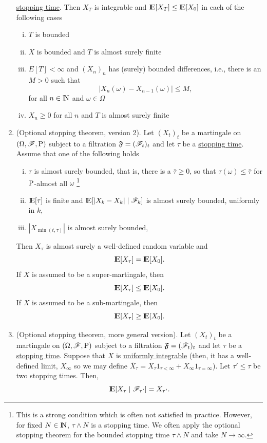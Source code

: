 \documentclass[a4paper,10pt]{scrbook}
\begin{document}
\begin{enumerate}
       \hyperlink{link:stopping_time}{stopping time}. 
       Then \(X_T\) is integrable and \(\E[X_T] \leq \E[X_0]\) in each of the following cases
	  \begin{enumerate}[i.]
	   \item \(T\) is bounded 
	   \item \(X\) is bounded and \(T\) is almost surely finite
	   \item \(E[T]<\infty\) and \((X_n)_n\) has (surely) bounded differences, i.e., there is an \(M>0\) such that
	    \[
	     |X_n(\omega) - X_{n-1}(\omega)| \leq M, 
	    \]
	   for all \(n\in\N\) and \(\omega\in\Omega\)
	   \item \(X_n\geq 0\) for all \(n\) and \(T\) is almost surely finite
	  \end{enumerate}

 \item (\hypertarget{link:ost2}{Optional stopping theorem, version 2}). 
       Let \((X_t)_t\) be a martingale on \((\Omega,\mathscr{F},\mathrm{P})\) subject  
       to a filtration \(\mathfrak{F} = (\mathscr{F}_t)_t\) and let \(\tau\) be a 
       \hyperlink{link:stopping_time}{stopping time}. Assume that one of the following holds
       \begin{enumerate}[i.]
        \item \(\tau\) is almost surely bounded, that is, there is a \(\bar\tau\geq 0\),
              so that \(\tau(\omega) \leq \bar\tau\) for \(\mathrm{P}\)-almost all \(\omega\)%
              \footnote{This is a strong condition which is often not satisfied in practice.
              However, for fixed $N\in\N$, $\tau \wedge N$ is a stopping time. 
              We often apply the optional stopping theorem for the bounded stopping 
              time $\tau \wedge N$ and take $N\to\infty$.}
        \item \(\E[\tau]\) is finite and \(\E[|X_{k} - X_{k}| {}\mid{} \F_k]\) is almost 
              surely bounded, uniformly in \(k\),
        \item \(|X_{\min(t, \tau)}|\) is almost surely bounded,
       \end{enumerate}
       Then \(X_{\tau}\) is almost surely a well-defined random variable and 
       \[\E[X_\tau] = \E[X_0].\]
       If \(X\) is assumed to be a super-martingale, then 
       \[\E[X_\tau] \leq \E[X_0].\]
       If \(X\) is assumed to be a sub-martingale, then 
       \[\E[X_\tau] \geq \E[X_0].\]
       
 \item (\hypertarget{link:ost3}{Optional stopping theorem}, more general version).
       Let \((X_t)_t\) be a martingale on \((\Omega,\mathscr{F},\mathrm{P})\) subject  
       to a filtration \(\mathfrak{F} = (\mathscr{F}_t)_t\) and let \(\tau\) be a 
       \hyperlink{link:stopping_time}{stopping time}.
       Suppose that $X$ is \hyperlink{link:uniformly_integrable}{uniformly integrable} 
       (then, it has a well-defined limit, $X_\infty$
       so we may define $\bar{X}_\tau = X_{\tau}1_{\tau < \infty} + X_{\infty}1_{\tau = \infty}$).
       Let $\tau' \leq \tau$ be two stopping times. Then,
       \[
        \E[X_\tau {}\mid{} \F_{\tau'}] = X_{\tau'}.
       \]



\end{enumerate}
\end{document}

